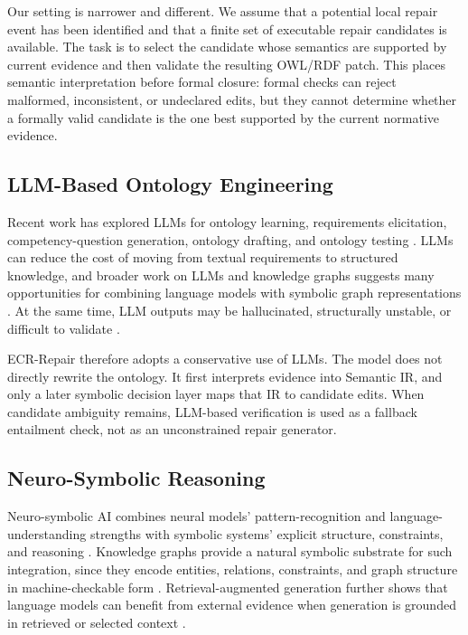 \documentclass[conference]{IEEEtran}
\begin{document}
Our setting is narrower and different. We assume that a potential local repair event has been identified and that a finite set of executable repair candidates is available. The task is to select the candidate whose semantics are supported by current evidence and then validate the resulting OWL/RDF patch. This places semantic interpretation before formal closure: formal checks can reject malformed, inconsistent, or undeclared edits, but they cannot determine whether a formally valid candidate is the one best supported by the current normative evidence.

\subsection{LLM-Based Ontology Engineering}

Recent work has explored LLMs for ontology learning, requirements elicitation, competency-question generation, ontology drafting, and ontology testing \cite{giglou2024llms4ol,lippolis2025ontologygeneration,zhang2025ontochat,fathallah2025neongpt}. LLMs can reduce the cost of moving from textual requirements to structured knowledge, and broader work on LLMs and knowledge graphs suggests many opportunities for combining language models with symbolic graph representations \cite{pan2024llmkg}. At the same time, LLM outputs may be hallucinated, structurally unstable, or difficult to validate \cite{ji2023hallucination}.

ECR-Repair therefore adopts a conservative use of LLMs. The model does not directly rewrite the ontology. It first interprets evidence into Semantic IR, and only a later symbolic decision layer maps that IR to candidate edits. When candidate ambiguity remains, LLM-based verification is used as a fallback entailment check, not as an unconstrained repair generator.

\subsection{Neuro-Symbolic Reasoning}

Neuro-symbolic AI combines neural models' pattern-recognition and language-understanding strengths with symbolic systems' explicit structure, constraints, and reasoning \cite{yu2023neurosymbolic}. Knowledge graphs provide a natural symbolic substrate for such integration, since they encode entities, relations, constraints, and graph structure in machine-checkable form \cite{hogan2021knowledgegraphs}. Retrieval-augmented generation further shows that language models can benefit from external evidence when generation is grounded in retrieved or selected context \cite{gao2024rag,asai2023selfrag}.
\end{document}
